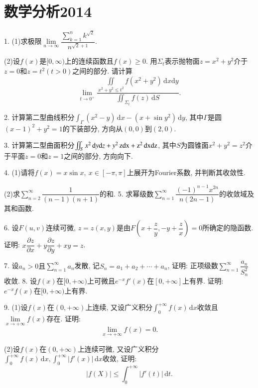 \documentclass[12pt, a4paper, twoside]{ctexart}%
\newcommand{\rmd}{\mathrm{d}} %
\begin{document}
	\section{数学分析2014}
	1. (1)求极限$\lim\limits_{n\rightarrow\infty}\dfrac{\sum\limits_{k=1}^n k^{\sqrt{2}}}{n^{\sqrt{2}+1}}$.\par
	\hspace{1.2em}(2)设$f(x)$是$[0,\infty)$上的连续函数且$f(x)\ge0$. 用$\Sigma_t$表示抛物面$z=x^2+y^2$介于$z=0\mbox{和}z=t^2(t>0)$之间的部分. 请计算\[
	\lim\limits_{t\rightarrow0^+}\dfrac{\iint\limits_{x^2+y^2\leq t^2}f(x^2+y^2)\,\rmd x\rmd y}{\iint_{\Sigma_t}f(z)\,\rmd S}.\]\par 
	2. 计算第二型曲线积分$\int_\Gamma(x^2-y)\,\rmd x-(x+\sin y^2)\,\rmd y$, 其中$\Gamma$是圆$(x-1)^2+y^2=1$的下装部分, 方向从$(0,0)\mbox{到}(2,0)$.\par 
	3. 计算第二型曲面积分$\iint_{S}x^2\,\rmd y\rmd z+y^2\,\rm z\rmd x+z^2\,\rmd x\rmd z$, 其中$S$为圆锥面$x^2+y^2=z^2$介于平面$z=0\mbox{和}z=1$之间的部分, 方向向下.\par
	4. (1)请将$f(x)=x\sin x,\ x\in[-\pi,\pi]$上展开为Fourier系数, 并判断其收敛性.\par 
	\hspace{1.2em}(2)求$\sum\limits_{n=2}^\infty\dfrac{1}{(n-1)(n+1)}$的和.
	5. 求幂级数$\sum\limits_{n=1}^\infty\dfrac{(-1)^{n-1}x^{2n}}{n(2n-1)}$的收敛域及其和函数.\par
	6. 设$F(u,v)$连续可微, $z=z(x,y)$是由$F(x+\dfrac{z}{y},-y+\dfrac{z}{x})=0$所确定的隐函数. 证明: $x\dfrac{\partial z}{\partial x}+y\dfrac{\partial z}{\partial y}+xy=z$.\par
	7. 设$a_n>0\mbox{且}\sum\limits_{n=1}^\infty a_n$发散, 记$S_n=a_1+a_2+\cdots+a_n$, 证明: 正项级数$\sum\limits_{n=1}^\infty \dfrac{a_n}{S_n^2}$收敛.
	8. 设$f(x)$在$[0,+\infty)$上可微且$e^{-x}f'(x)\mbox{在}[0,+\infty]$上有界. 证明: $e^{-x}f(x)\mbox{在}[0,+\infty)$上有界.\par
	9. (1)设$f(x)\mbox{在}(0,+\infty)$上连续, 又设广义积分$\int_0^{+\infty}f(x)\,\rmd x$收敛且$\lim\limits_{x\rightarrow+\infty}f(x)$存在. 证明: \[\lim\limits_{x\rightarrow+\infty}f(x)=0.\]\par
	\hspace{1.2em}(2)设$f(x)\mbox{在}(0,+\infty)$上连续可微, 又设广义积分$\int_0^{+\infty}f(x)\,\rmd x, \int_0^{+\infty}|f'(x)|\,\rmd x$收敛, 证明: \[|f(X)|\leq\int_0^{+\infty}|f'(t)|\,\rmd t.\]\par 
	
	
	\clearpage
\end{document}
